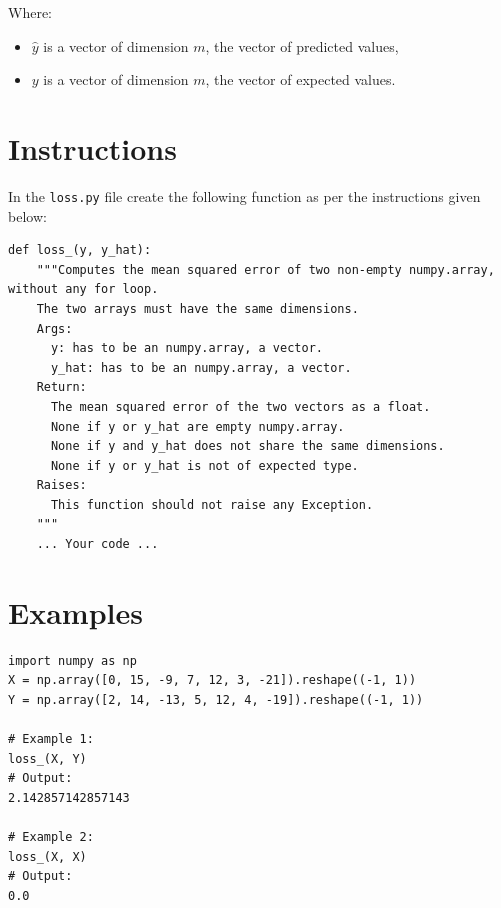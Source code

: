 \documentclass{42-en}
\begin{document}
Where:
\begin{itemize}
  \item $\hat{y}$ is a vector of dimension $m$, the vector of predicted values,
  \item $y$ is a vector of dimension $m$, the vector of expected values.
\end{itemize}


\section*{Instructions}
In the \texttt{loss.py} file create the following function as per the instructions given below:

\begin{verbatim}
def loss_(y, y_hat):
    """Computes the mean squared error of two non-empty numpy.array, without any for loop.
    The two arrays must have the same dimensions.
    Args:
      y: has to be an numpy.array, a vector.
      y_hat: has to be an numpy.array, a vector.
    Return:
      The mean squared error of the two vectors as a float.
      None if y or y_hat are empty numpy.array.
      None if y and y_hat does not share the same dimensions.
      None if y or y_hat is not of expected type.
    Raises:
      This function should not raise any Exception.
    """
    ... Your code ...
\end{verbatim}

\section*{Examples}
\begin{verbatim}
import numpy as np
X = np.array([0, 15, -9, 7, 12, 3, -21]).reshape((-1, 1))
Y = np.array([2, 14, -13, 5, 12, 4, -19]).reshape((-1, 1))

# Example 1:
loss_(X, Y)
# Output:
2.142857142857143

# Example 2:
loss_(X, X)
# Output:
0.0
\end{verbatim}



\newpage

\end{document}
